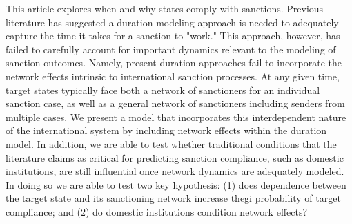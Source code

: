 This article explores when and why states comply with sanctions. Previous literature has suggested a duration modeling approach is needed to adequately capture the time it takes for a sanction to "work." This approach, however, has failed to carefully account for important dynamics relevant to the modeling of sanction outcomes. Namely, present duration approaches fail to incorporate the network effects intrinsic to international sanction processes. At any given time, target states typically face both a network of sanctioners for an individual sanction case, as well as a general network of sanctioners including senders from multiple cases. We present a model that incorporates this interdependent nature of the international system by including network effects within the duration model. In addition, we are able to test whether traditional conditions that the literature claims as critical for predicting sanction compliance, such as domestic institutions, are still influential once network dynamics are adequately modeled. In doing so we are able to test two key hypothesis: (1) does dependence between the target state and its sanctioning network increase thegi probability of target compliance; and (2) do domestic institutions condition network effects?